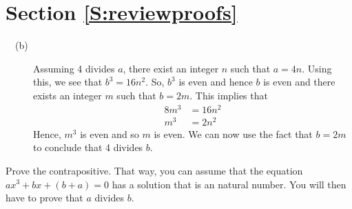 \section*{Section \ref{S:reviewproofs}}

\begin{list}{\bf{~\ref{exer:sec32-9}.}}
\item \begin{description}
\item[~~(b)] Assuming 4 divides $a$, there exist an integer $n$ such that $a = 4n$.  Using this, we see that $b^3 = 16n^2$. So, $b^3$ is even and hence $b$ is even and there exists an integer $m$ such that $b = 2m$.  This implies that
\begin{align*}
8m^3 &= 16n^2 \\
m^3 &= 2n^2
\end{align*}
Hence, $m^3$ is even and so $m$ is even.  We can now use the fact that $b = 2m$ to conclude that 4 divides $b$.
\end{description}
\end{list}

\begin{list}{\bf{\ref{exer:sec32-equation}.}}
\item Prove the contrapositive.  That way, you can assume that the equation $ax^3 + bx + \left( b + a \right) = 0$ has a solution that is an natural number.  You will then have to prove that $a$ divides $b$.
\end{list}
\hbreak

\endinput
